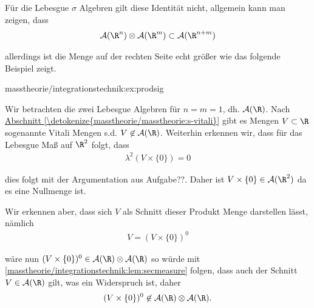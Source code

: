 \documentclass[letterpaper,10pt,german]{jupyterBook}
\begin{document}
\par
Für die Lebesgue \(\sigma\) Algebren gilt diese Identität nicht, allgemein kann man zeigen, dass
\begin{align*}
\mathcal{A}(\R^n)\otimes\mathcal{A}(\R^m)\subset \mathcal{A}(\R^{n+m})
\end{align*}
\par
allerdings ist die Menge auf der rechten Seite echt größer wie das folgende Beispiel zeigt.
\begin{example}{}{masstheorie/integrationstechnik:ex:prodsig}



\par
Wir betrachten die zwei Lebesgue Algebren für \(n=m=1\), dh. \(\mathcal{A}(\R)\). Nach \hyperref[\detokenize{masstheorie/masstheorie:s-vitali}]{Abschnitt \ref{\detokenize{masstheorie/masstheorie:s-vitali}}} gibt es Mengen \(V\subset\R\) sogenannte Vitali Mengen s.d. \(V\not\in\mathcal{A}(\R)\). Weiterhin erkennen wir, dass für das Lebesgue Maß auf \(\R^2\) folgt, dass
\begin{align*}
\lambda^{2}(V\times\{0\}) = 0
\end{align*}
\par
dies folgt mit der Argumentation aus Aufgabe??. Daher ist \(V\times\{0\}\in \mathcal{A}(\R^2)\) da es eine Nullmenge ist.

\par
Wir erkennen aber, dass sich \(V\) als Schnitt dieser Produkt Menge darstellen lässt, nämlich
\begin{align*}
V = (V\times\{0\})^0
\end{align*}
\par
wäre nun \((V\times\{0\})^0\in \mathcal{A}(\R)\otimes\mathcal{A}(\R)\) so würde mit \cref{masstheorie/integrationstechnik:lem:secmeasure} folgen, dass auch der Schnitt \(V\in\mathcal{A}(\R)\) gilt, was ein Widerspruch ist, daher
\begin{align*}
(V\times\{0\})^0 \not\in  \mathcal{A}(\R)\otimes\mathcal{A}(\R).
\end{align*}\end{example}
\end{document}
